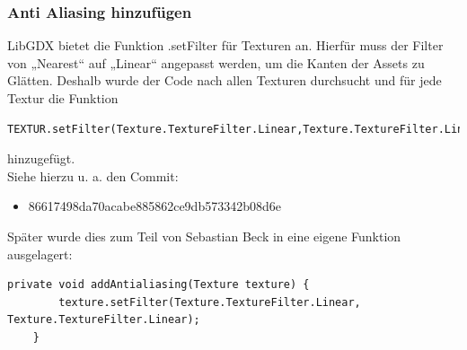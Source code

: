 \subsubsection{Anti Aliasing hinzufügen}
LibGDX bietet die Funktion .setFilter für Texturen an. Hierfür muss der Filter von „Nearest“ auf „Linear“ angepasst werden, um die Kanten der Assets zu Glätten. Deshalb wurde der Code nach allen Texturen durchsucht und für jede Textur die Funktion
\begin{lstlisting}
TEXTUR.setFilter(Texture.TextureFilter.Linear,Texture.TextureFilter.Linear);
\end{lstlisting}
hinzugefügt. \\
Siehe hierzu u. a. den Commit:
\begin{itemize}
\item 86617498da70acabe885862ce9db573342b08d6e
\end{itemize}

Später wurde dies zum Teil von Sebastian Beck in eine eigene Funktion ausgelagert:\\
\begin{lstlisting}[basicstyle=\tiny]
private void addAntialiasing(Texture texture) {
        texture.setFilter(Texture.TextureFilter.Linear, Texture.TextureFilter.Linear);
    }
\end{lstlisting}

